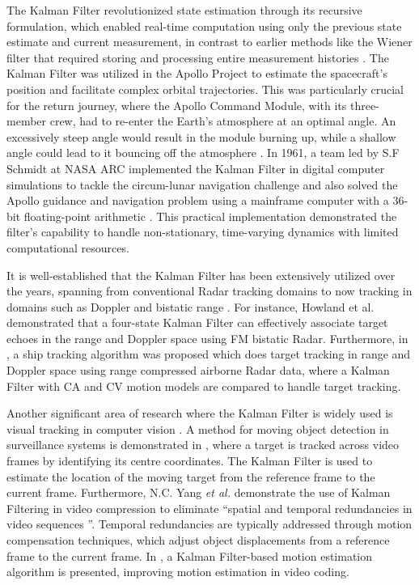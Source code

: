 The Kalman Filter revolutionized state estimation through its recursive formulation, which enabled real-time computation using only the previous state estimate and current measurement, in contrast to earlier methods like the Wiener filter that required storing and processing entire measurement histories \cite{Andrews2010,schmidt1981}. The Kalman Filter was utilized in the Apollo Project to estimate the spacecraft's position and facilitate complex orbital trajectories. This was particularly crucial for the return journey, where the Apollo Command Module, with its three-member crew, had to re-enter the Earth's atmosphere at an optimal angle. An excessively steep angle would result in the module burning up, while a shallow angle could lead to it bouncing off the atmosphere \cite{Andrews2010}. In 1961, a team led by S.F Schmidt at \ac{NASA} \ac{ARC} implemented the Kalman Filter in digital computer simulations to tackle the circum-lunar navigation challenge and also solved the Apollo guidance and navigation problem using a mainframe computer with a 36-bit floating-point arithmetic \cite{Andrews2010}. This practical implementation demonstrated the filter's capability to handle non-stationary, time-varying dynamics with limited computational resources.

It is well-established that the Kalman Filter has been extensively utilized over the years, spanning from conventional \ac{Radar} tracking domains to now tracking in domains such as Doppler and bistatic range \cite{Joshi2022,Howland2005a}. For instance,  Howland et al.~\cite{Howland2005a}  demonstrated that a four-state Kalman Filter can effectively associate target echoes in the range and Doppler space using FM bistatic \ac{Radar}. Furthermore, in \cite{Joshi2022}, a ship tracking algorithm was proposed which does target tracking in range and Doppler space using range compressed airborne \ac{Radar} data, where a Kalman Filter with \ac{CA} and \ac{CV} motion models are compared to handle target tracking.

Another significant area of research where the Kalman Filter is widely used is visual tracking in computer vision \cite{Gunjal2018, Merven2004}. A method for moving object detection in surveillance systems is demonstrated in \cite{Gunjal2018}, where a target is tracked across video frames by identifying its centre coordinates. The Kalman Filter is used to estimate the location of the moving target from the reference frame to the current frame. Furthermore, N.C. Yang \textit{et al.} \cite{Yang2009} demonstrate the use of Kalman Filtering in video compression to eliminate \textquotedblleft spatial and temporal redundancies in video sequences \textquotedblright. Temporal redundancies are typically addressed through motion compensation techniques, which adjust object displacements from a reference frame to the current frame. In \cite{Yang2009}, a Kalman Filter-based motion estimation algorithm is presented, improving motion estimation in video coding.


